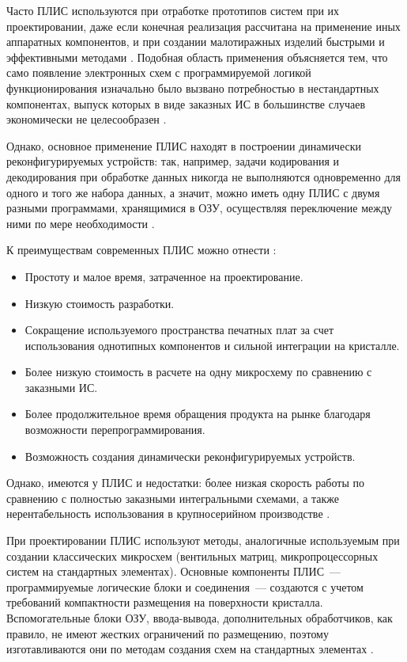 Часто ПЛИС используются при отработке прототипов систем при их проектировании, даже если конечная реализация рассчитана на применение иных аппаратных компонентов, и при создании малотиражных изделий быстрыми и эффективными методами \cite[с.~392]{ugryumov}.
Подобная область применения объясняется тем, что само появление электронных схем с программируемой логикой функционирования изначально было вызвано потребностью в нестандартных компонентах, выпуск которых в виде заказных ИС в большинстве случаев экономически не целесообразен \cite[c.~4]{popov}.

Однако, основное применение ПЛИС находят в построении динамически реконфигурируемых устройств: так, например, задачи кодирования и декодирования при обработке данных никогда не выполняются одновременно для одного и того же набора данных, а значит, можно иметь одну ПЛИС с двумя разными программами, хранящимися в ОЗУ, осуществляя переключение между ними по мере необходимости \cite[c.~410]{ugryumov}.

К преимуществам современных ПЛИС можно отнести \cite[c.~17]{popov}:
\begin{itemize}
  \item Простоту и малое время, затраченное на проектирование.
  \item Низкую стоимость разработки.
  \item Сокращение используемого пространства печатных плат за счет использования однотипных компонентов и сильной интеграции на кристалле.
  \item Более низкую стоимость в расчете на одну микросхему по сравнению с заказными ИС.
  \item Более продолжительное время обращения продукта на рынке благодаря возможности перепрограммирования.
  \item Возможность создания динамически реконфигурируемых устройств.
\end{itemize}

Однако, имеются у ПЛИС и недостатки: более низкая скорость работы по сравнению с полностью заказными интегральными схемами, а также нерентабельность использования в крупносерийном производстве \cite[c.~447]{ugryumov}.

При проектировании ПЛИС используют методы, аналогичные используемым при создании классических микросхем (вентильных матриц, микропроцессорных систем на стандартных элементах).
Основные компоненты ПЛИС~--- программируемые логические блоки и соединения~--- создаются с учетом требований компактности размещения на поверхности кристалла.
Вспомогательные блоки ОЗУ, ввода-вывода, дополнительных обработчиков, как правило, не имеют жестких ограничений по размещению, поэтому изготавливаются они по методам создания схем на стандартных элементах \cite[c.~59]{maxfield}.

